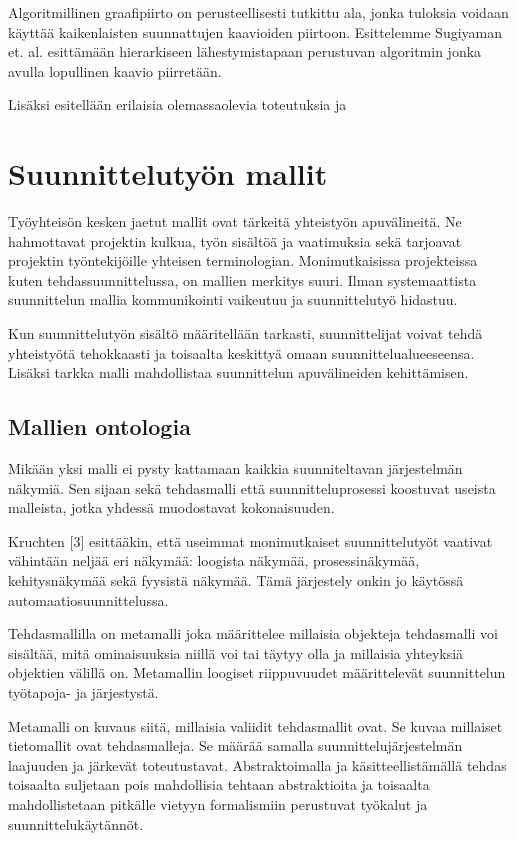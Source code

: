 \documentclass[finnish,12pt]{article}
\begin{document}
Algoritmillinen graafipiirto on perusteellisesti tutkittu ala, jonka tuloksia voidaan käyttää kaikenlaisten suunnattujen kaavioiden piirtoon. Esittelemme Sugiyaman et. al. \cite{RefWorks:9} esittämään hierarkiseen lähestymistapaan perustuvan algoritmin jonka avulla lopullinen kaavio piirretään.

Lisäksi esitellään erilaisia olemassaolevia toteutuksia ja 


	\clearpage
	\section{Suunnittelutyön mallit}

Työyhteisön kesken jaetut mallit ovat tärkeitä yhteistyön apuvälineitä. Ne hahmottavat projektin kulkua, työn sisältöä ja vaatimuksia sekä tarjoavat projektin työntekijöille yhteisen terminologian. Monimutkaisissa projekteissa kuten tehdassuunnittelussa, on mallien merkitys suuri. Ilman systemaattista suunnittelun mallia kommunikointi vaikeutuu ja suunnittelutyö hidastuu.

Kun suunnittelutyön sisältö määritellään tarkasti, suunnittelijat voivat tehdä yhteistyötä tehokkaasti ja toisaalta keskittyä omaan suunnittelualueeseensa. Lisäksi tarkka malli mahdollistaa suunnittelun apuvälineiden kehittämisen.

		\subsection{Mallien ontologia}

Mikään yksi malli ei pysty kattamaan kaikkia suunniteltavan järjestelmän näkymiä. Sen sijaan sekä tehdasmalli että suunnitteluprosessi koostuvat useista malleista, jotka yhdessä muodostavat kokonaisuuden.

Kruchten [3] esittääkin, että useimmat monimutkaiset suunnittelutyöt vaativat vähintään neljää eri näkymää: loogista näkymää, prosessinäkymää, kehitysnäkymää sekä fyysistä näkymää. Tämä järjestely onkin jo käytössä automaatiosuunnittelussa.

Tehdasmallilla on metamalli joka määrittelee millaisia objekteja tehdasmalli voi sisältää, mitä ominaisuuksia niillä voi tai täytyy olla ja millaisia yhteyksiä objektien välillä on. Metamallin loogiset riippuvuudet määrittelevät suunnittelun työtapoja- ja järjestystä.

Metamalli on kuvaus siitä, millaisia valiidit tehdasmallit ovat. Se kuvaa millaiset tietomallit ovat tehdasmalleja. Se määrää samalla suunnittelujärjestelmän laajuuden ja järkevät toteutustavat. Abstraktoimalla ja käsitteellistämällä tehdas toisaalta suljetaan pois mahdollisia tehtaan abstraktioita ja toisaalta mahdollistetaan pitkälle vietyyn formalismiin perustuvat työkalut ja suunnittelukäytännöt.
\end{document}
